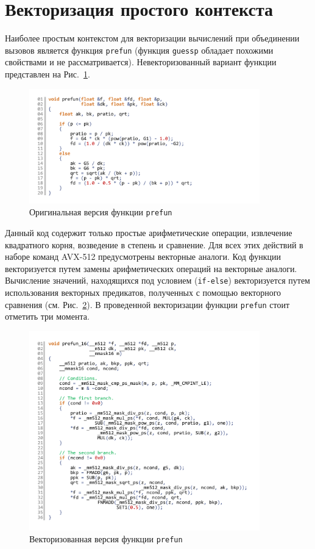 \documentclass[utf8]{psta}
\begin{document}
\section{Векторизация простого контекста}

Наиболее простым контекстом для векторизации вычислений при объединении вызовов является функция \texttt{prefun} (функция \texttt{guessp} обладает похожими свойствами и не рассматривается).
Невекторизованный вариант функции представлен на Рис.~\ref{pic:prefun_code}.

\begin{figure}
\includegraphics[width=10cm]{pics/pic_prefun_code}
\caption{Оригинальная версия функции \texttt{prefun}}
\label{pic:prefun_code}
\end{figure}

Данный код содержит только простые арифметические операции, извлечение квадратного корня, возведение в степень и сравнение.
Для всех этих действий в наборе команд AVX-512 предусмотрены векторные аналоги.
Код функции векторизуется путем замены арифметических операций на векторные аналоги.
Вычисление значений, находящихся под условием (\texttt{if-else}) векторизуется путем использования векторных предикатов, полученных с помощью векторного сравнения (см. Рис.~\ref{pic:prefun_16_code}).
В проведенной векторизации функции \texttt{prefun} стоит отметить три момента.

\begin{figure}
\includegraphics[width=10cm]{pics/pic_prefun_16_code}
\caption{Векторизованная версия функции \texttt{prefun}}
\label{pic:prefun_16_code}
\end{figure}
\end{document}
